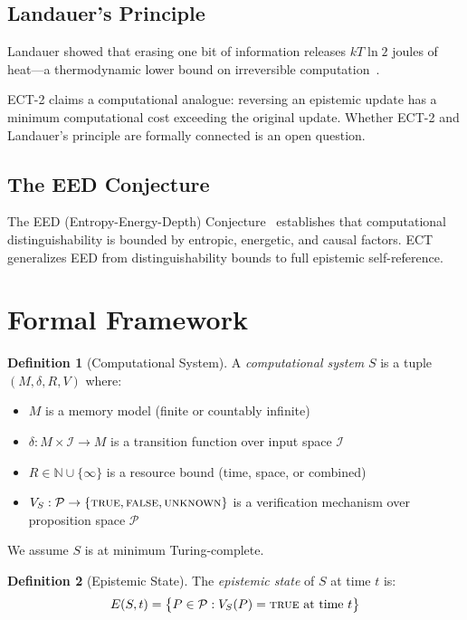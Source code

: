 \documentclass[12pt]{article}
\theoremstyle{definition}
\newtheorem{definition}{Definition}[section]
\newcommand{\ES}{E(S, t)}
\begin{document}
\subsection{Landauer's Principle}

Landauer showed that erasing one bit of information releases $kT\ln 2$ joules of heat---a thermodynamic lower bound on irreversible computation~\cite{landauer1961}.

ECT-2 claims a computational analogue: reversing an epistemic update has a minimum computational cost exceeding the original update. Whether ECT-2 and Landauer's principle are formally connected is an open question.

\subsection{The EED Conjecture}

The EED (Entropy-Energy-Depth) Conjecture~\cite{eed2025} establishes that computational distinguishability is bounded by entropic, energetic, and causal factors. ECT generalizes EED from distinguishability bounds to full epistemic self-reference.

\section{Formal Framework}
\label{sec:framework}

\begin{definition}[Computational System]
A \emph{computational system} $S$ is a tuple $(M, \delta, R, V)$ where:
\begin{itemize}[leftmargin=1.5em]
  \item $M$ is a memory model (finite or countably infinite)
  \item $\delta : M \times \mathcal{I} \to M$ is a transition function over input space $\mathcal{I}$
  \item $R \in \mathbb{N} \cup \{\infty\}$ is a resource bound (time, space, or combined)
  \item $V_S : \mathcal{P} \to \{\textsc{true}, \textsc{false}, \textsc{unknown}\}$ is a verification mechanism over proposition space $\mathcal{P}$
\end{itemize}
We assume $S$ is at minimum Turing-complete.
\end{definition}

\begin{definition}[Epistemic State]
The \emph{epistemic state} of $S$ at time $t$ is:
\[
  \ES = \bigl\{ P \in \mathcal{P} : V_S(P) = \textsc{true} \text{ at time } t \bigr\}
\]
\end{definition}
\end{document}
